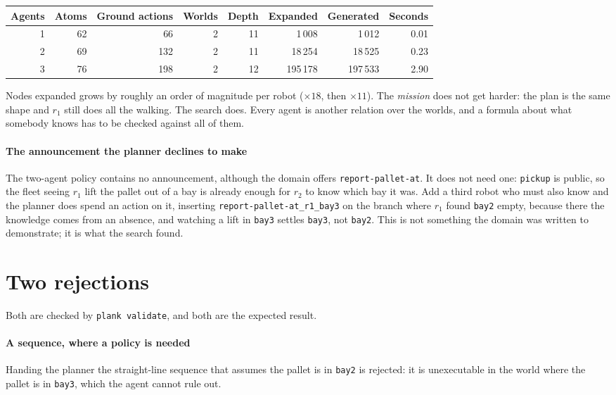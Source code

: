 \documentclass[11pt,a4paper]{article}
\theoremstyle{definition}
\newcommand{\code}[1]{\texttt{\small #1}}
\begin{document}
\begin{center}
\begin{tabular}{@{}rrrrrrrr@{}}
\toprule
Agents & Atoms & Ground actions & Worlds & Depth & Expanded & Generated & Seconds \\
\midrule
1 & 62 & 66 & 2 & 11 & 1\,008 & 1\,012 & 0.01 \\
2 & 69 & 132 & 2 & 11 & 18\,254 & 18\,525 & 0.23 \\
3 & 76 & 198 & 2 & 12 & 195\,178 & 197\,533 & 2.90 \\
\bottomrule
\end{tabular}
\end{center}

Nodes expanded grows by roughly an order of magnitude per robot ($\times 18$,
then $\times 11$). The \emph{mission} does not get harder: the plan is the same
shape and $r_1$ still does all the walking. The search does. Every agent is
another relation over the worlds, and a formula about what somebody knows has
to be checked against all of them.

\paragraph{The announcement the planner declines to make} The two-agent policy
contains no announcement, although the domain offers \code{report-pallet-at}.
It does not need one: \code{pickup} is public, so the fleet seeing $r_1$ lift
the pallet out of a bay is already enough for $r_2$ to know which bay it was.
Add a third robot who must also know and the planner does spend an action on
it, inserting \code{report-pallet-at\_r1\_bay3} on the branch where $r_1$ found
\code{bay2} empty, because there the knowledge comes from an absence, and
watching a lift in \code{bay3} settles \code{bay3}, not \code{bay2}. This is
not something the domain was written to demonstrate; it is what the search
found.

\section{Two rejections}

Both are checked by \code{plank validate}, and both are the expected result.

\paragraph{A sequence, where a policy is needed} Handing the planner the
straight-line sequence that assumes the pallet is in \code{bay2} is rejected:
it is unexecutable in the world where the pallet is in \code{bay3}, which the
agent cannot rule out.
\end{document}
